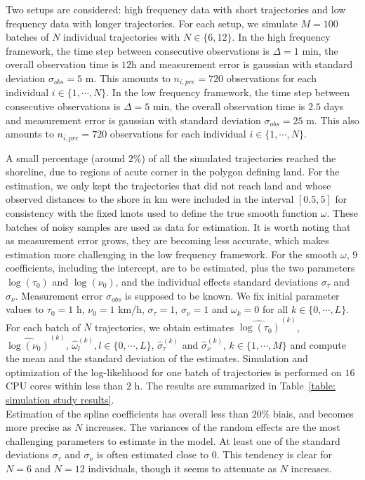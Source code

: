 \documentclass[11pt]{article}
\newcommand {\1}{\mathbb{1}}
\theoremstyle{definition}
\theoremstyle{remark}
\theoremstyle{remark}
\begin{document}
Two setups are considered: high frequency data with short trajectories and low frequency data with longer trajectories. For each setup, we simulate $M=100$ batches of $N$ individual trajectories with $N \in \{6,12\}$. In the high frequency framework, the time step between consecutive observations is $\Delta=1$ min, the overall observation time is $12$h and measurement error is gaussian with standard deviation $\sigma_{obs}=5$ m. This amounts to $n_{i,pre}=720$ observations for each individual $i \in \{1,\cdots,N\}$. In the low frequency framework, the time step between consecutive observations is $\Delta=5$ min, the overall observation time is $2.5$ days and measurement error is gaussian with standard deviation $\sigma_{obs}=25$ m. This also amounts to $n_{i,pre}=720$ observations for each individual $i \in \{1,\cdots,N\}$.

A small percentage (around $2\%$) of all the simulated trajectories reached the shoreline, due to regions of acute corner in the polygon defining land. For the estimation, we only kept the trajectories that did not reach land and whose observed distances to the shore in km were included in the interval $[0.5,5]$ for consistency with the fixed knots used to define the true smooth function $\omega$. 
These batches of noisy samples are used as data for estimation. It is worth noting that as measurement error grows, they are becoming less accurate, which makes estimation more challenging in the low frequency framework. For the smooth $\omega$, $9$ coefficients, including the intercept, are to be estimated, plus the two parameters $\log(\tau_0)$ and $\log(\nu_0)$, and the individual effects standard deviations $\sigma_{\tau}$ and $\sigma_{\nu}$. Measurement error $\sigma_{obs}$ is supposed to be known.  
We fix initial parameter values to $\tau_{0}=1$ h, $\nu_{0} = 1$ km/h, $\sigma_{\tau}=1$, $\sigma_{\nu}=1$ and $\omega_k=0$ for all $k \in \{0,\cdots,L\}$. 
For each batch of $N$ trajectories, we obtain estimates $\widehat{\log(\tau_{0})}^{(k)}$, $\widehat{\log(\nu_{0})}^{(k)}$, $\hat{\omega}_l^{(k)}, l \in \{0,\cdots, L\}$, $\hat{\sigma}_{\tau}^{(k)}$ and $\hat{\sigma}_{\nu}^{(k)}$, $k \in \{1,\cdots,M\}$ and compute the mean  and the standard deviation of the estimates. Simulation and optimization of the log-likelihood for one batch of trajectories is performed on $16$ CPU cores within less than $2$ h. The results are summarized in Table~\ref{table: simulation study results}.\\

Estimation of the spline coefficients has overall less than $20 \%$ biais, and becomes more precise as $N$ increases.
The variances of the random effects are the most challenging parameters to estimate in the model. At least one of the standard deviations $\sigma_{\tau}$ and $\sigma_{\nu}$ is often estimated close to $0$. This tendency is clear for $N=6$ and $N=12$ individuals, though it seems to attenuate as $N$ increases.
\end{document}
